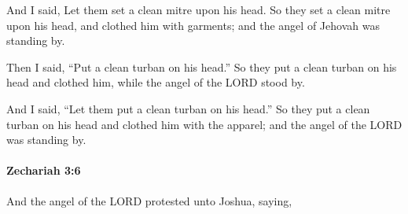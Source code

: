 			\begin{versebox}
					\item[BHS] 
					\item[LXX] 
					\item[ASV] And I said, Let them set a clean mitre upon his head. So they set a clean mitre upon his head, and clothed him with garments; and the angel of Jehovah was standing by.
					\item[NIV] Then I said, “Put a clean turban on his head.” So they put a clean turban on his head and clothed him, while the angel of the LORD stood by.
					\item[NRSV] And I said, “Let them put a clean turban on his head.” So they put a clean turban on his head and clothed him with the apparel; and the angel of the LORD was standing by.
			\end{versebox}

		\paragraph{Zechariah 3:6} %
			\label{ZECHARIAH-3-6}

			And the angel of the LORD protested unto Joshua, saying,


